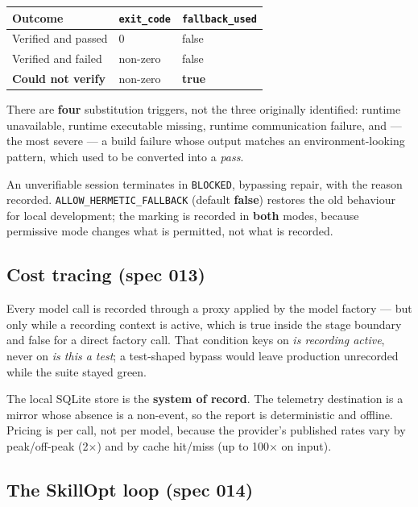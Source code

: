 \documentclass[11pt,a4paper]{article}
\begin{document}
\begin{center}
\begin{tabular}{@{}lll@{}}
\toprule
\textbf{Outcome} & \texttt{exit\_code} & \texttt{fallback\_used} \\
\midrule
Verified and passed & 0 & false \\
Verified and failed & non-zero & false \\
\textbf{Could not verify} & non-zero & \textbf{true} \\
\bottomrule
\end{tabular}
\end{center}

There are \textbf{four} substitution triggers, not the three originally identified:
runtime unavailable, runtime executable missing, runtime communication failure, and
--- the most severe --- a build failure whose output matches an environment-looking
pattern, which used to be converted into a \emph{pass}.

An unverifiable session terminates in \texttt{BLOCKED}, bypassing repair, with the
reason recorded. \texttt{ALLOW\_HERMETIC\_FALLBACK} (default \textbf{false})
restores the old behaviour for local development; the marking is recorded in
\textbf{both} modes, because permissive mode changes what is permitted, not what is
recorded.

\subsection{Cost tracing (spec 013)}

Every model call is recorded through a proxy applied by the model factory --- but
only while a recording context is active, which is true inside the stage boundary
and false for a direct factory call. That condition keys on \emph{is recording
active}, never on \emph{is this a test}; a test-shaped bypass would leave production
unrecorded while the suite stayed green.

The local SQLite store is the \textbf{system of record}. The telemetry destination is
a mirror whose absence is a non-event, so the report is deterministic and offline.
Pricing is per call, not per model, because the provider's published rates vary by
peak/off-peak (2$\times$) and by cache hit/miss (up to 100$\times$ on input).

\subsection{The SkillOpt loop (spec 014)}
\end{document}

